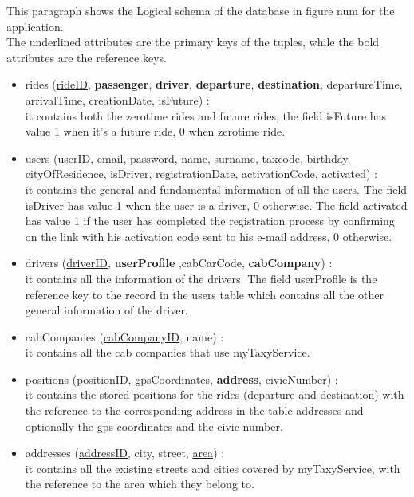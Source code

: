 \documentclass[\mainpath/main]{subfiles}
\begin{document}
This paragraph shows the Logical schema of the database in figure num for the application.\\
The underlined attributes are the primary keys of the tuples, while the
bold attributes are the reference keys.\\
\begin{itemize}
	\item rides (\underline{rideID}, \textbf{passenger}, \textbf{driver}, \textbf{departure}, \textbf{destination}, departureTime, arrivalTime, creationDate, isFuture) : \\
	it contains both the zerotime rides and future rides, the field isFuture has value 1 when it's a future ride, 0 when zerotime ride.
	
	\item users (\underline{userID}, email, password, name, surname, taxcode, birthday, cityOfResidence, isDriver, registrationDate, activationCode, activated) : \\
	it contains the general and fundamental information of all the users. The field isDriver has value 1 when the user is a driver, 0 otherwise. The field activated has value 1 if the user has completed the registration process by confirming on the link with his activation code sent to his e-mail address, 0 otherwise.
	
	\item drivers (\underline{driverID}, \textbf{userProfile} ,cabCarCode, \textbf{cabCompany}) : \\
	it contains all the information of the drivers. The field userProfile is the reference key to the record in the users table which contains all the other general information of the driver.
	
	\item cabCompanies (\underline{cabCompanyID}, name) : \\
	it contains all the cab companies that use myTaxyService.
	
	\item positions (\underline{positionID}, gpsCoordinates, \textbf{address}, civicNumber) : \\
	it contains the stored positions for the rides (departure and destination) with the reference to the corresponding address in the table addresses and optionally the gps coordinates and the civic number.
	
	\item addresses (\underline{addressID}, city, street, \underline{area}) : \\
	it contains all the existing streets and cities covered by myTaxyService, with the reference to the area which they belong to.
	

\end{itemize}
\end{document}
